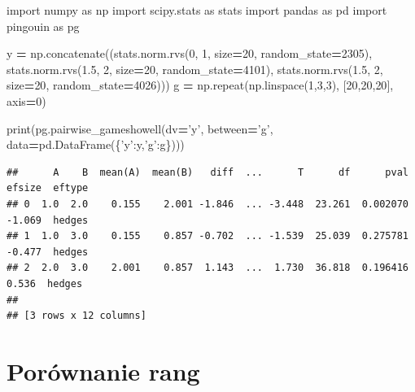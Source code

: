 \documentclass[polish,]{book}
\newenvironment{Shaded}{\begin{snugshade}}{\end{snugshade}}
\newcommand{\BuiltInTok}[1]{#1}
\newcommand{\DecValTok}[1]{\textcolor[rgb]{0.00,0.00,0.81}{#1}}
\newcommand{\FloatTok}[1]{\textcolor[rgb]{0.00,0.00,0.81}{#1}}
\newcommand{\ImportTok}[1]{#1}
\newcommand{\NormalTok}[1]{#1}
\newcommand{\OperatorTok}[1]{\textcolor[rgb]{0.81,0.36,0.00}{\textbf{#1}}}
\newcommand{\StringTok}[1]{\textcolor[rgb]{0.31,0.60,0.02}{#1}}
\begin{document}
\begin{Shaded}
\begin{Highlighting}[]
\ImportTok{import}\NormalTok{ numpy }\ImportTok{as}\NormalTok{ np}
\ImportTok{import}\NormalTok{ scipy.stats }\ImportTok{as}\NormalTok{ stats}
\ImportTok{import}\NormalTok{ pandas }\ImportTok{as}\NormalTok{ pd}
\ImportTok{import}\NormalTok{ pingouin }\ImportTok{as}\NormalTok{ pg}

\NormalTok{y }\OperatorTok{=}\NormalTok{ np.concatenate((stats.norm.rvs(}\DecValTok{0}\NormalTok{, }\DecValTok{1}\NormalTok{, size}\OperatorTok{=}\DecValTok{20}\NormalTok{, random_state}\OperatorTok{=}\DecValTok{2305}\NormalTok{),}
\NormalTok{                    stats.norm.rvs(}\FloatTok{1.5}\NormalTok{, }\DecValTok{2}\NormalTok{, size}\OperatorTok{=}\DecValTok{20}\NormalTok{, random_state}\OperatorTok{=}\DecValTok{4101}\NormalTok{),}
\NormalTok{                    stats.norm.rvs(}\FloatTok{1.5}\NormalTok{, }\DecValTok{2}\NormalTok{, size}\OperatorTok{=}\DecValTok{20}\NormalTok{, random_state}\OperatorTok{=}\DecValTok{4026}\NormalTok{)))}
\NormalTok{g }\OperatorTok{=}\NormalTok{ np.repeat(np.linspace(}\DecValTok{1}\NormalTok{,}\DecValTok{3}\NormalTok{,}\DecValTok{3}\NormalTok{), [}\DecValTok{20}\NormalTok{,}\DecValTok{20}\NormalTok{,}\DecValTok{20}\NormalTok{], axis}\OperatorTok{=}\DecValTok{0}\NormalTok{)}

\BuiltInTok{print}\NormalTok{(pg.pairwise_gameshowell(dv}\OperatorTok{=}\StringTok{'y'}\NormalTok{, between}\OperatorTok{=}\StringTok{'g'}\NormalTok{,}
\NormalTok{                           data}\OperatorTok{=}\NormalTok{pd.DataFrame(\{}\StringTok{'y'}\NormalTok{:y,}\StringTok{'g'}\NormalTok{:g\})))}
\end{Highlighting}
\end{Shaded}

\begin{verbatim}
##      A    B  mean(A)  mean(B)   diff  ...      T      df      pval  efsize  eftype
## 0  1.0  2.0    0.155    2.001 -1.846  ... -3.448  23.261  0.002070  -1.069  hedges
## 1  1.0  3.0    0.155    0.857 -0.702  ... -1.539  25.039  0.275781  -0.477  hedges
## 2  2.0  3.0    2.001    0.857  1.143  ...  1.730  36.818  0.196416   0.536  hedges
## 
## [3 rows x 12 columns]
\end{verbatim}

\hypertarget{R82}{%
\section{Porównanie rang}\label{R82}}
\end{document}
